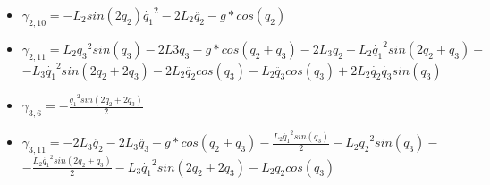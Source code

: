 \begin{itemize}
\item $\gamma_{2,10}= - L_{2}sin(2q_2)\dot{q_1}^{2} - 2L_{2}\ddot{q_2} - g*cos(q_2)$ \\ \vspace{0.2cm}
\item $\gamma_{2,11}=  L_{2}{q_3}^{2}sin(q_3) - 2L3\ddot{q_3} - g*cos(q_2 + q_3) - 2L_{3}\ddot{q_2} - L_{2}\dot{q_1}^{2}sin(2q_2 + q_3) - $\\ \vspace{0.1cm}
	$- L_{3}\dot{q_1}^{2}sin(2q_2 + 2q_3) - 2L_2\ddot{q_2}cos(q_3) - L_{2}\ddot{q_3}cos(q_3) + 2L_{2}\dot{q_2}\dot{q_3}sin(q_3) $\\ \vspace{0.2cm}
\item $\gamma_{3,6}=-\frac{\dot{q_1}^{2}sin(2q_2 + 2q_3)}{2} $\\ \vspace{0.2cm}
\item $\gamma_{3,11}=- 2L_{3}\ddot{q_2} - 2L_3\ddot{q_3} - g*cos(q_2 + q_3) - \frac{L_{2}\dot{q_1}^{2}sin(q_3)}{2} - L_2\dot{q_2}^{2}sin(q_3) - $\\ \vspace{0.1cm}
$-\frac{L_2\dot{q_1}^{2}sin(2q_2 + q_3)}{2} - L_{3}\dot{q_1}^{2}sin(2q_2 + 2q_3) - L_2\ddot{q_2}cos(q_3) $\\
\end{itemize}

